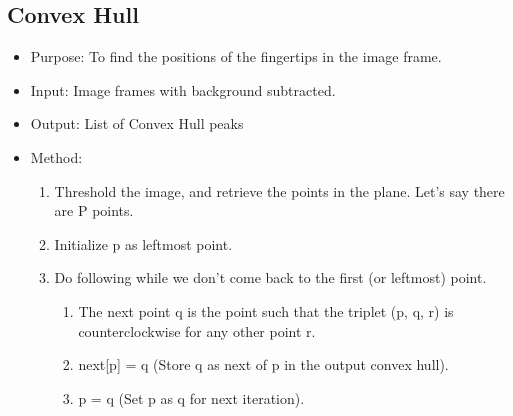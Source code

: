 \documentclass[11pt]{report}
\begin{document}
\subsection{Convex Hull}
\begin{itemize}
    \item Purpose: To find the positions of the fingertips in the image frame.
    \item Input: Image frames with background subtracted.
    \item Output: List of Convex Hull peaks
    \item Method:
    \begin{enumerate}
        \item Threshold the image, and retrieve the points in the plane. Let's say there are P points.
        \item Initialize p as leftmost point.
        \item Do following while we don’t come back to the first (or leftmost) point.
        \begin{enumerate}
            \item The next point q is the point such that the triplet (p, q, r) is counterclockwise for any other point r.
            \item next[p] = q (Store q as next of p in the output convex hull).
            \item p = q (Set p as q for next iteration).
        \end{enumerate}
    \end{enumerate}
\end{itemize}
\end{document}

